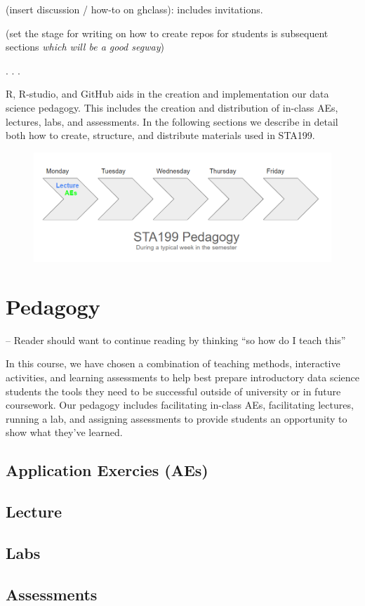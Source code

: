 \documentclass[
  12pt]{article}
\begin{document}
(insert discussion / how-to on ghclass): includes invitations.

(set the stage for writing on how to create repos for students is
subsequent sections \emph{which will be a good segway})

. . .

R, R-studio, and GitHub aids in the creation and implementation our data
science pedagogy. This includes the creation and distribution of
in-class AEs, lectures, labs, and assessments. In the following sections
we describe in detail both how to create, structure, and distribute
materials used in STA199.

\begin{figure}

{\centering \includegraphics{images/pedagogy.png}

}

\end{figure}

\hypertarget{sec-ped}{%
\section{Pedagogy}\label{sec-ped}}

-- Reader should want to continue reading by thinking ``so how do I
teach this''

In this course, we have chosen a combination of teaching methods,
interactive activities, and learning assessments to help best prepare
introductory data science students the tools they need to be successful
outside of university or in future coursework. Our pedagogy includes
facilitating in-class AEs, facilitating lectures, running a lab, and
assigning assessments to provide students an opportunity to show what
they've learned.

\hypertarget{application-exercies-aes}{%
\subsection{Application Exercies (AEs)}\label{application-exercies-aes}}

\hypertarget{lecture}{%
\subsection{Lecture}\label{lecture}}

\hypertarget{labs}{%
\subsection{Labs}\label{labs}}

\hypertarget{assessments}{%
\subsection{Assessments}\label{assessments}}


\renewcommand\refname{Discussion}
  
\end{document}
